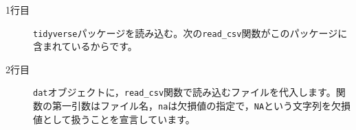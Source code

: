 \begin{description}
	\item[1行目] \texttt{tidyverse}パッケージを読み込む。次の\verb|read_csv|関数がこのパッケージに含まれているからです。
	\item[2行目] \texttt{dat}オブジェクトに，\verb|read_csv|関数で読み込むファイルを代入します。関数の第一引数はファイル名，\verb|na|は欠損値の指定で，\texttt{NA}という文字列を欠損値として扱うことを宣言しています。
\end{description}
